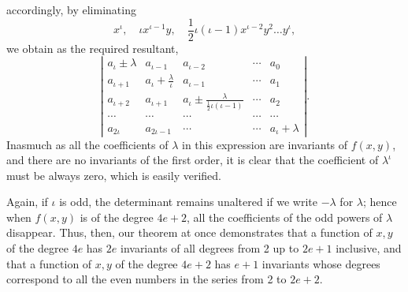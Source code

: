 \documentclass[11pt]{article}
\newcommand{\sourcepage}[1]{\marginpar{\scriptsize p.~#1}}
\begin{document}
{{\sourcepage{277}
accordingly, by eliminating
\[
x^\iota,\quad \iota x^{\iota-1}y,\quad \frac12\iota(\iota-1)x^{\iota-2}y^2\ldots y^\iota,
\]
we obtain as the required resultant\footnotemark,
\[
\left|\begin{array}{ccccc}
a_\iota\pm\lambda&a_{\iota-1}&a_{\iota-2}&\cdots&a_0\\
a_{\iota+1}&a_\iota+\frac{\lambda}{\iota}&a_{\iota-1}&\cdots&a_1\\
a_{\iota+2}&a_{\iota+1}&a_\iota\pm\frac{\lambda}{\frac12\iota(\iota-1)}&\cdots&a_2\\
\cdots&\cdots&\cdots&\cdots&\cdots\\
a_{2\iota}&a_{2\iota-1}&\cdots&\cdots&a_\iota+\lambda
\end{array}\right|.
\]
Inasmuch as all the coefficients of $\lambda$ in this expression are invariants of $f(x,y)$, and there are no invariants of the first order, it is clear that the coefficient of $\lambda^\iota$ must be always zero, which is easily verified.

Again, if $\iota$ is odd, the determinant remains unaltered if we write $-\lambda$ for $\lambda$; hence when $f(x,y)$ is of the degree $4e+2$, all the coefficients of the odd powers of $\lambda$ disappear. Thus, then, our theorem at once demonstrates that a function of $x,y$ of the degree $4e$ has $2e$ invariants of all degrees from 2 up to $2e+1$ inclusive, and that a function of $x,y$ of the degree $4e+2$ has $e+1$ invariants whose degrees correspond to all the even numbers in the series from 2 to $2e+2$.

}}
\end{document}
